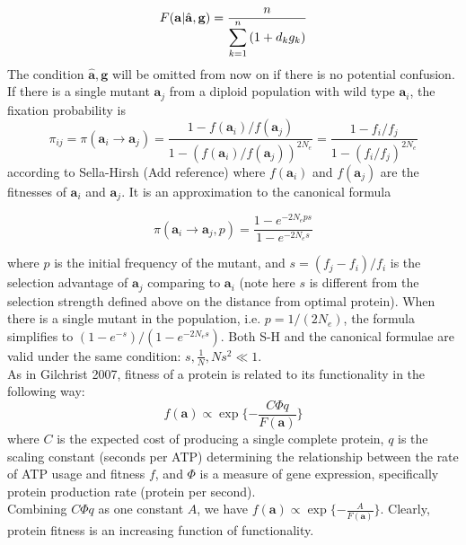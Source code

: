 \documentclass[13pt]{article}
\begin{document}
\begin{equation}
F(\mathbf{a}| \hat{\mathbf{a}},\mathbf{g})  =  \frac{n}{\displaystyle  \sum_{k=1}^n{(1+d_kg_k)}} \label{eq:harmonic}\\
\end{equation}
The condition $\hat{\mathbf{a}},\mathbf{g}$ will be omitted from now on if there is no potential confusion.\\

If there is a single mutant $\mathbf{a}_j$ from a diploid population with wild type $\mathbf{a}_i$, the fixation probability is 
\begin{equation}
\pi_{ij} = \pi(\mathbf{a}_i \rightarrow \mathbf{a}_j ) = \frac{1-f(\mathbf{a}_i)/f(\mathbf{a}_j)}{1-(f(\mathbf{a}_i)/f(\mathbf{a}_j))^{2N_e}} = \frac{1-f_i/f_j}{1-(f_i/f_j)^{2N_e}}
\label{eq:fixation}
\end{equation}
according to Sella-Hirsh (Add reference)
where $f(\mathbf{a}_i)$ and $f(\mathbf{a}_j)$ are the fitnesses of $\mathbf{a}_i$ and $\mathbf{a}_j$. It is an approximation to the canonical formula 

\begin{equation}
\pi(\mathbf{a}_i \rightarrow \mathbf{a}_j,p) = \frac{1-e^{-2N_e ps}}{1-e^{-2N_es}}
\label{eq:fixcanonical}
\end{equation}

\noindent where $p$ is the initial frequency of the mutant, and $s=(f_j-f_i)/f_i$ is the selection advantage of $\mathbf{a}_j$ comparing to $\mathbf{a}_i$ (note here $s$  is different from the selection strength defined above on the distance from optimal protein).
When there is a single mutant in the population, i.e. $p=1/(2N_e)$, the formula simplifies to 
$(1-e^{-s})/(1-e^{-2N_es})$. Both S-H and the canonical formulae are valid under the same condition: $s, \frac{1}{N}, Ns^2 \ll 1$.\\


As in Gilchrist 2007, fitness of a protein is related to its functionality in the following way:
\[f(\mathbf{a}) \propto \exp\{-\frac{C\Phi q}{F(\mathbf{a})}\}\]
where $C$ is the expected cost of producing a single complete protein, $q$ is the scaling constant (seconds per ATP) determining the relationship between the rate of ATP usage and fitness $f$, and $\Phi$ is a measure of gene expression, specifically protein production rate (protein per second). \\

Combining $C\Phi q$ as one constant $A$, we have
$f(\mathbf{a}) \propto \exp\{-\frac{A}{F(\mathbf{a})}\}$.
Clearly, protein fitness is an increasing function of functionality.\\
\end{document}
